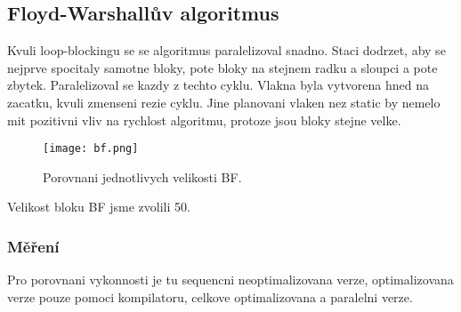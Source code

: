 \documentclass[a4paper,11pt]{article}
\begin{document}
\subsection{Floyd-Warshallův algoritmus}
Kvuli loop-blockingu se se algoritmus paralelizoval snadno. Staci dodrzet, aby se nejprve spocitaly samotne bloky, pote bloky na stejnem radku a sloupci a pote zbytek. Paralelizoval se kazdy z techto cyklu. Vlakna byla vytvorena hned na zacatku, kvuli zmenseni rezie cyklu. Jine planovani vlaken nez static by nemelo mit pozitivni vliv na rychlost algoritmu, protoze jsou bloky stejne velke.

\begin{figure}[H]
  \begin{center}
    \texttt{[image: bf.png]}
  \end{center}
  \caption{Porovnani jednotlivych velikosti BF.}\label{graf:fig8}
\end{figure}

Velikost bloku BF jsme zvolili 50.
\subsubsection{Měření}
Pro porovnani vykonnosti je tu sequencni neoptimalizovana verze, optimalizovana verze pouze pomoci kompilatoru, celkove optimalizovana a paralelni verze.
\end{document}
